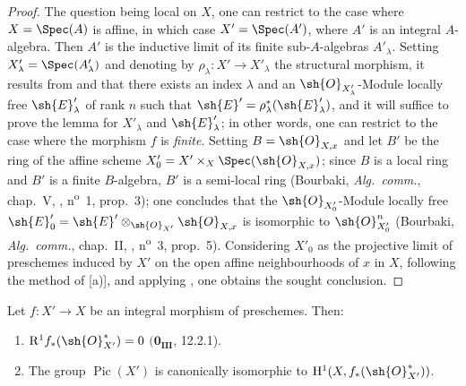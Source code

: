 \begin{proof}
The question being local on $X$, one can restrict to the case where $X=\Spec(A)$ is affine, in which case $X'=\Spec(A')$, where $A'$ is an integral $A$-algebra.
Then $A'$ is the inductive limit of its finite sub-$A$-algebras $A'_\lambda$.
Setting $X'_\lambda=\Spec(A'_\lambda)$ and denoting by $\rho_\lambda:X'\to X'_\lambda$ the structural morphism, it results from  and  that there exists an index $\lambda$ and an $\sh{O}_{X'_\lambda}$-Module locally free $\sh{E}'_\lambda$ of rank $n$ such that $\sh{E}'=\rho_\lambda^*(\sh{E}'_\lambda)$, and it will suffice to prove the lemma for $X'_\lambda$ and $\sh{E}'_\lambda$;
in other words, one can restrict to the case where the morphism $f$ is \emph{finite}.
Setting $B=\sh{O}_{X,x}$ and let $B'$ be the ring of the affine scheme $X'_0=X'\times_X\Spec(\sh{O}_{X,x})$;
since $B$ is a local ring and $B'$ is a finite $B$-algebra, $B'$ is a semi-local ring (Bourbaki, \emph{Alg.~comm.}, chap.~V, , n\textsuperscript{o}~1, prop.~3);
one concludes that the $\sh{O}_{X'_0}$-Module locally free $\sh{E}'_0=\sh{E}'\otimes_{\sh{O}_{X'}}\sh{O}_{X,x}$ is isomorphic to $\sh{O}_{X'_0}^n$ (Bourbaki, \emph{Alg.~comm.}, chap.~II, , n\textsuperscript{o}~3, prop.~5).
Considering $X'_0$ as the projective limit of preschemes induced by $X'$ on the open affine neighbourhoods of $x$ in $X$, following the method of [a)], and applying , one obtains the sought conclusion.
\end{proof}

\begin{corollary}[21.8.2]
\label{IV.21.8.2}
Let $f:X'\to X$ be an integral morphism of preschemes. Then:
\begin{enumerate}[label=\emph{(\roman*)}]
  \item $\mathrm{R}^1f_*(\sh{O}_{X'}^*)=0$ $(\mathbf{0_{III}}$, 12.2.1).
  \item The group $\operatorname{Pic}(X')$ is canonically isomorphic to $\mathrm{H}^1(X,f_*(\sh{O}_{X'}^*))$.
\end{enumerate}
\end{corollary}

